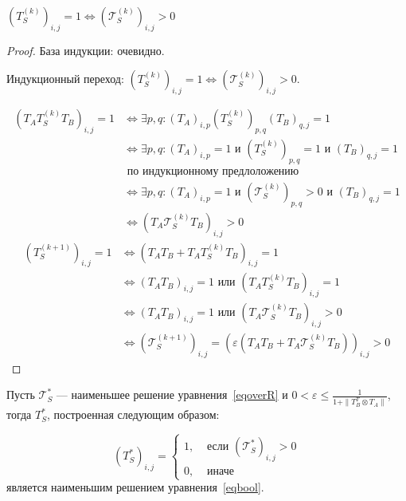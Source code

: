 \documentclass[12pt]{matmex-diploma-custom}
\begin{document}
\begin{lemma}
$(T_S^{(k)})_{i,j} = 1 \Leftrightarrow (\mathcal{T}_S^{(k)})_{i,j}  > 0$
\end{lemma}

\begin{proof}
База индукции: очевидно.

Индукционный переход: $(T_S^{(k)})_{i,j} = 1 \Leftrightarrow (\mathcal{T}_S^{(k)})_{i,j}  > 0$.

\begin{align*}
(T_AT_S^{(k)}T_B)_{i,j} = 1 
&\Leftrightarrow \exists p, q: (T_A)_{i, p}(T_S^{(k)})_{p, q}(T_B)_{q,j} = 1 \\
&\Leftrightarrow \exists p, q: (T_A)_{i, p} = 1 \text{ и }  (T_S^{(k)})_{p, q} = 1 \text{ и }
(T_B)_{q,j} = 1 \\
& \text{ по индукционному предлоложению } \\
& \Leftrightarrow \exists p, q: (T_A)_{i, p} = 1 \text{ и }  (\mathcal{T}_S^{(k)})_{p, q} > 0 \text{ и }
(T_B)_{q,j} = 1 \\
& \Leftrightarrow (T_A\mathcal{T}_S^{(k)}T_B)_{i,j} > 0 
\end{align*}
\begin{align*}
(T_S^{(k+1)})_{i,j} = 1 
&\Leftrightarrow (T_AT_B + T_AT_S^{(k)}T_B)_{i,j} = 1 \\
&\Leftrightarrow  (T_AT_B)_{i,j} = 1 \text{ или } (T_AT_S^{(k)}T_B)_{i,j} = 1 \\
&\Leftrightarrow (T_AT_B)_{i,j} = 1 \text{ или } (T_A\mathcal{T}_S^{(k)}T_B)_{i,j} > 0  \\
&\Leftrightarrow (\mathcal{T}_S^{(k+1)})_{i,j} = (\varepsilon (T_AT_B + T_A\mathcal{T}_S^{(k)}T_B))_{i,j} > 0
\end{align*}
\end{proof}

\begin{lemma}
Пусть $\mathcal{T}_S^*$ --- наименьшее решение уравнения~\ref{eqoverR} и $\displaystyle  0 < \varepsilon \leq \frac{1}{1 + \| T_B^T \otimes T_A\|}$, тогда $T_S^*$, построенная следующим образом: 

\begin{equation}
(T_S^*)_{i, j} =
\begin{cases}
  1, & \text{ если } (\mathcal{T}_S^*)_{i, j} > 0 \\
  0, & \text{ иначе}
\end{cases}
\end{equation}
является наименьшим решением уравнения~\ref{eqbool}.
\end{lemma}
\end{document}
